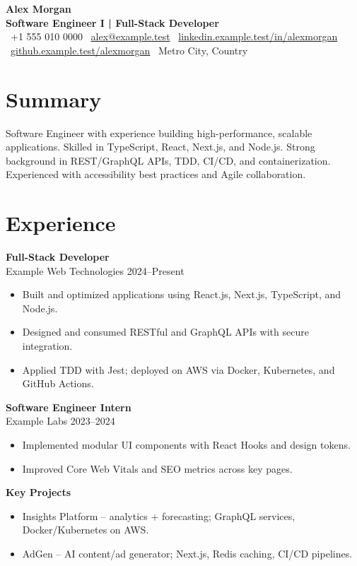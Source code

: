 \documentclass[a4paper,11pt]{article}
\begin{document}
\begin{center}
    {\Huge \textbf{Alex Morgan}}\\[3pt]
    {\color{gray}\textbf{Software Engineer I | Full-Stack Developer}}\\[9pt]
    \small
    \textbullet\ +1 555 010 0000 \textbullet\ \href{mailto:alex@example.test}{alex@example.test} \textbullet\ \href{https://linkedin.example.test/in/alexmorgan}{linkedin.example.test/in/alexmorgan} \textbullet\ \href{https://github.example.test/alexmorgan}{github.example.test/alexmorgan} \textbullet\ Metro City, Country
\end{center}
\section*{Summary}
Software Engineer with experience building high-performance, scalable applications. Skilled in TypeScript, React, Next.js, and Node.js. Strong background in REST/GraphQL APIs, TDD, CI/CD, and containerization. Experienced with accessibility best practices and Agile collaboration.
\section*{Experience}
\textbf{Full-Stack Developer} \\
Example Web Technologies \hfill 2024–Present
\begin{itemize}
    \item Built and optimized applications using React.js, Next.js, TypeScript, and Node.js.
    \item Designed and consumed RESTful and GraphQL APIs with secure integration.
    \item Applied TDD with Jest; deployed on AWS via Docker, Kubernetes, and GitHub Actions.
\end{itemize}
\textbf{Software Engineer Intern} \\
Example Labs \hfill 2023–2024
\begin{itemize}
    \item Implemented modular UI components with React Hooks and design tokens.
    \item Improved Core Web Vitals and SEO metrics across key pages.
\end{itemize}

\vspace{2pt}
\textbf{Key Projects}
\begin{itemize}
    \item Insights Platform – analytics + forecasting; GraphQL services, Docker/Kubernetes on AWS.
    \item AdGen – AI content/ad generator; Next.js, Redis caching, CI/CD pipelines.
\end{itemize}
\end{document}

